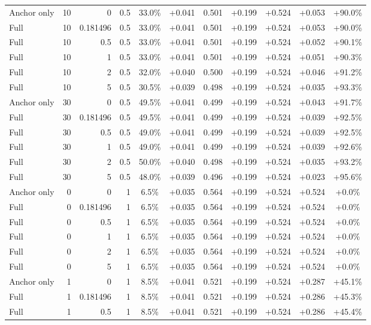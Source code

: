 \begin{table}[htbp]
\begin{tabular}{lrrrccccccc}
Anchor only & 10 & 0 & 0.5 & 33.0\% & +0.041 & 0.501 & +0.199 & +0.524 & +0.053 & +90.0\% \\
Full & 10 & 0.181496 & 0.5 & 33.0\% & +0.041 & 0.501 & +0.199 & +0.524 & +0.053 & +90.0\% \\
Full & 10 & 0.5 & 0.5 & 33.0\% & +0.041 & 0.501 & +0.199 & +0.524 & +0.052 & +90.1\% \\
Full & 10 & 1 & 0.5 & 33.0\% & +0.041 & 0.501 & +0.199 & +0.524 & +0.051 & +90.3\% \\
Full & 10 & 2 & 0.5 & 32.0\% & +0.040 & 0.500 & +0.199 & +0.524 & +0.046 & +91.2\% \\
Full & 10 & 5 & 0.5 & 30.5\% & +0.039 & 0.498 & +0.199 & +0.524 & +0.035 & +93.3\% \\
Anchor only & 30 & 0 & 0.5 & 49.5\% & +0.041 & 0.499 & +0.199 & +0.524 & +0.043 & +91.7\% \\
Full & 30 & 0.181496 & 0.5 & 49.5\% & +0.041 & 0.499 & +0.199 & +0.524 & +0.039 & +92.5\% \\
Full & 30 & 0.5 & 0.5 & 49.0\% & +0.041 & 0.499 & +0.199 & +0.524 & +0.039 & +92.5\% \\
Full & 30 & 1 & 0.5 & 49.0\% & +0.041 & 0.499 & +0.199 & +0.524 & +0.039 & +92.6\% \\
Full & 30 & 2 & 0.5 & 50.0\% & +0.040 & 0.498 & +0.199 & +0.524 & +0.035 & +93.2\% \\
Full & 30 & 5 & 0.5 & 48.0\% & +0.039 & 0.496 & +0.199 & +0.524 & +0.023 & +95.6\% \\
Anchor only & 0 & 0 & 1 & 6.5\% & +0.035 & 0.564 & +0.199 & +0.524 & +0.524 & +0.0\% \\
Full & 0 & 0.181496 & 1 & 6.5\% & +0.035 & 0.564 & +0.199 & +0.524 & +0.524 & +0.0\% \\
Full & 0 & 0.5 & 1 & 6.5\% & +0.035 & 0.564 & +0.199 & +0.524 & +0.524 & +0.0\% \\
Full & 0 & 1 & 1 & 6.5\% & +0.035 & 0.564 & +0.199 & +0.524 & +0.524 & +0.0\% \\
Full & 0 & 2 & 1 & 6.5\% & +0.035 & 0.564 & +0.199 & +0.524 & +0.524 & +0.0\% \\
Full & 0 & 5 & 1 & 6.5\% & +0.035 & 0.564 & +0.199 & +0.524 & +0.524 & +0.0\% \\
Anchor only & 1 & 0 & 1 & 8.5\% & +0.041 & 0.521 & +0.199 & +0.524 & +0.287 & +45.1\% \\
Full & 1 & 0.181496 & 1 & 8.5\% & +0.041 & 0.521 & +0.199 & +0.524 & +0.286 & +45.3\% \\
Full & 1 & 0.5 & 1 & 8.5\% & +0.041 & 0.521 & +0.199 & +0.524 & +0.286 & +45.4\% \\

\end{tabular}
\end{table}
